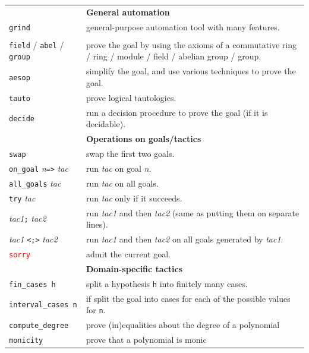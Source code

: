 \documentclass[a4paper]{article}
\newcommand{\lean}[1]{{\tt #1}}
\newcommand{\tactic}[1][]{\textit{tac#1}\xspace} %
\newcommand{\nat}{\textit{n}\xspace}
\begin{document}
\begin{center}
\begin{longtable}{@{}lp{113mm}@{}}
  \hline
  &\textbf{General automation}\\
  \lean{grind} & general-purpose automation tool with many features. \\
  \makecell[lt]{\lean{ring} / \lean{noncomm\_ring} / \lean{module} \\ \lean{field} / \lean{abel} / \lean{group}} & prove the goal by using the axioms of a commutative ring / ring / module / field / abelian group / group. \\
  \lean{aesop} & simplify the goal, and use various techniques to prove the goal. \\
  \lean{tauto} & prove logical tautologies. \\
  \lean{decide} & run a decision procedure to prove the goal (if it is decidable). \\
  \hline
  &\textbf{Operations on goals/tactics}\\
  \lean{swap} & swap the first two goals. \\
  \lean{on\_goal} \nat \lean{=>} \tactic & run \tactic on goal \nat. \\
  \lean{all\_goals} \tactic & run \tactic on all goals. \\
  \lean{try} \tactic & run \tactic only if it succeeds. \\
  \tactic[1]\lean{;} \tactic[2] & run \tactic[1] and then \tactic[2] (same as putting them on separate lines). \\
  \tactic[1] \lean{<;>} \tactic[2] & run \tactic[1] and then \tactic[2] on all goals generated by \tactic[1]. \\
  \textcolor{red}{\lean{sorry}} & admit the current goal.\\
  \hline
  &\textbf{Domain-specific tactics}\\
  \lean{fin\_cases h} & split a hypothesis \lean{h} into finitely many cases. \\
  \lean{interval\_cases n} & if split the goal into cases for each of the possible values for \lean{n}.\\
  \lean{compute\_degree} & prove (in)equalities about the degree of a polynomial \\
  \lean{monicity} & prove that a polynomial is monic \\

\end{longtable}
\end{center}
\end{document}
